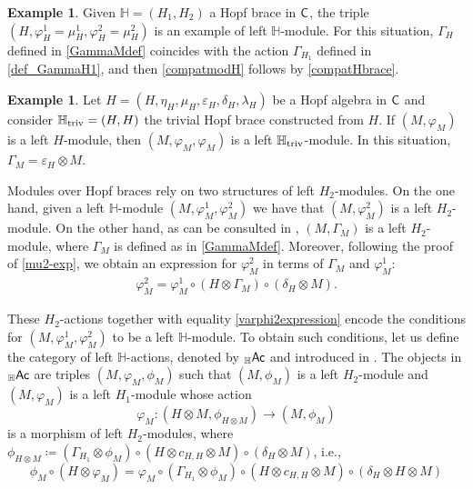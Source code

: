 \documentclass[11pt,reqno]{amsart}
\theoremstyle{plain}%
\theoremstyle{definition}
\newtheorem{example}[theorem]{Example}%
\theoremstyle{remark}
\begin{document}
\begin{example}\label{ex_HmodHbrace}
	Given $\mathbb{H}=(H_{1},H_{2})$ a Hopf brace in ${\sf C}$, the triple $(H,\varphi_{H}^{1}=\mu_{H}^{1},\varphi_{H}^{2}=\mu_{H}^{2})$ is an example of left $\mathbb{H}$-module. For this situation, $\Gamma_{H}$ defined in \eqref{GammaMdef} coincides with the action $\Gamma_{H_{1}}$ defined in \eqref{def_GammaH1}, and then \eqref{compatmodH} follows by \eqref{compatHbrace}.
\end{example}



\begin{example}
	Let $H=(H,\eta_{H},\mu_{H},\varepsilon_{H},\delta_{H},\lambda_{H})$ be a Hopf algebra in ${\sf C}$ and consider $\mathbb{H}_{\textnormal{triv}}=(H,H)$ the trivial Hopf brace constructed from $H$. If $(M,\varphi_{M})$ is a left $H$-module, then $(M,\varphi_{M},\varphi_{M})$ is a left $\mathbb{H}_{\textnormal{triv}}$-module. In this situation, $\Gamma_{M}=\varepsilon_{H}\otimes M$.
\end{example}

Modules over Hopf braces rely on two structures of left $H_2$-modules. On the one hand, given a left $\mathbb H$-module $(M, \varphi_M^1, \varphi_M^2)$ we have that $(M, \varphi_M^2)$ is a left $H_2$-module. On the other hand, as can be consulted in \cite[Lemma 2.11]{VGRRProj}, $(M, \Gamma_M)$ is a left $H_2$-module, where $\Gamma_M$ is defined as in \eqref{GammaMdef}. Moreover, following the proof of \eqref{mu2-exp}, we obtain an expression for $\varphi_M^2$ in terms of $\Gamma_M$ and $\varphi_M^1$:
\begin{gather}\label{varphi2expression}
	\varphi_{M}^{2}=\varphi_{M}^{1}\circ(H\otimes\Gamma_{M})\circ(\delta_{H}\otimes M).
\end{gather}

These $H_2$-actions together with equality \eqref{varphi2expression} encode the conditions for $(M, \varphi_M^1, \varphi_M^2)$ to be a left $\mathbb H$-module. To obtain such conditions,  let us define the category of left ${\mathbb H}$-actions, denoted by  $_{\mathbb H}\sf{Ac}$ and introduced in \cite{Ramos}. The objects in $_{\mathbb H}\sf{Ac}$ are triples  $(M, \varphi_M, \phi_M)$ such that  $(M, \phi_M)$ is a left $H_2$-module and $(M, \varphi_M)$ is a left $H_1$-module whose action $$\varphi_M:(H\otimes M, \phi_{H\otimes M})\to (M, \phi_M)$$ is a morphism of left $H_2$-modules, where $\phi_{H\otimes M} \coloneqq (\Gamma_{H_1}\otimes \phi_M)\circ (H\otimes c_{H,H}\otimes M)\circ (\delta_H\otimes M)$, i.e., 
\begin{equation}
\label{linearphi}
\phi_{M}\circ (H\otimes \varphi_{M})=\varphi_{M}\circ (\Gamma_{H_{1}}\otimes \phi_{M})\circ (H\otimes c_{H,H}\otimes M)\circ (\delta_{H}\otimes H\otimes M)
\end{equation}
\end{document}
